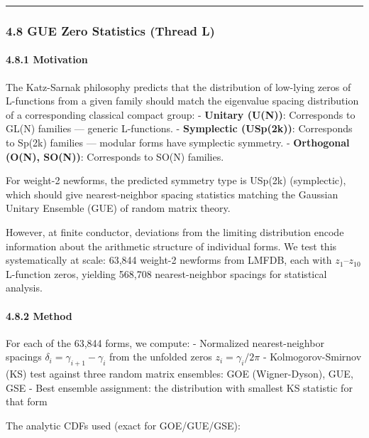 \documentclass[
]{article}
\begin{document}
\begin{center}\rule{0.5\linewidth}{0.5pt}\end{center}

\hypertarget{gue-zero-statistics-thread-l}{%
\subsubsection{4.8 GUE Zero Statistics (Thread
L)}\label{gue-zero-statistics-thread-l}}

\hypertarget{motivation-1}{%
\paragraph{4.8.1 Motivation}\label{motivation-1}}

The Katz-Sarnak philosophy predicts that the distribution of low-lying
zeros of L-functions from a given family should match the eigenvalue
spacing distribution of a corresponding classical compact group: -
\textbf{Unitary (U(N))}: Corresponds to GL(N) families --- generic
L-functions. - \textbf{Symplectic (USp(2k))}: Corresponds to Sp(2k)
families --- modular forms have symplectic symmetry. -
\textbf{Orthogonal (O(N), SO(N))}: Corresponds to SO(N) families.

For weight-2 newforms, the predicted symmetry type is USp(2k)
(symplectic), which should give nearest-neighbor spacing statistics
matching the Gaussian Unitary Ensemble (GUE) of random matrix theory.

However, at finite conductor, deviations from the limiting distribution
encode information about the arithmetic structure of individual forms.
We test this systematically at scale: 63,844 weight-2 newforms from
LMFDB, each with \(z_1\)--\(z_{10}\) L-function zeros, yielding 568,708
nearest-neighbor spacings for statistical analysis.

\hypertarget{method}{%
\paragraph{4.8.2 Method}\label{method}}

For each of the 63,844 forms, we compute: - Normalized nearest-neighbor
spacings \(\delta_i = \gamma_{i+1} - \gamma_i\) from the unfolded zeros
\(z_i = \gamma_i / 2\pi\) - Kolmogorov-Smirnov (KS) test against three
random matrix ensembles: GOE (Wigner-Dyson), GUE, GSE - Best ensemble
assignment: the distribution with smallest KS statistic for that form

The analytic CDFs used (exact for GOE/GUE/GSE):
\end{document}
